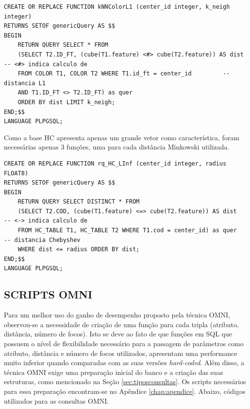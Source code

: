 \begin{lstlisting}[caption={Consulta k-vizinhos mais próximos sequencial utilizando cor e distância city-block}, captionpos=t,basicstyle=\tiny]
CREATE OR REPLACE FUNCTION kNNColorL1 (center_id integer, k_neigh integer) 
RETURNS SETOF genericQuery AS $$
BEGIN
	RETURN QUERY SELECT * FROM 
	(SELECT T2.ID_FT, (cube(T1.feature) <#> cube(T2.feature)) AS dist  -- <#> indica calculo de 
	FROM COLOR T1, COLOR T2 WHERE T1.id_ft = center_id 		   -- distancia L1
	AND T1.ID_FT <> T2.ID_FT) as quer 
	ORDER BY dist LIMIT k_neigh;	
END;$$
LANGUAGE PLPGSQL;
\end{lstlisting}

Como a base HC apresenta apenas um grande vetor como característica, foram necessárias apenas 3 funções, uma para cada distância Minkowski utilizada.

\begin{lstlisting}[caption={Consulta por abrangência sequencial utilizando distância Chebyshev para a base HC}, captionpos=t, basicstyle=\tiny]
CREATE OR REPLACE FUNCTION rq_HC_LInf (center_id integer, radius FLOAT8) 
RETURNS SETOF genericQuery AS $$
BEGIN
	RETURN QUERY SELECT DISTINCT * FROM 
	(SELECT T2.COD, (cube(T1.feature) <=> cube(T2.feature)) AS dist   -- <-> indica calculo de
	FROM HC_TABLE T1, HC_TABLE T2 WHERE T1.cod = center_id) as quer   -- distancia Chebyshev
	WHERE dist <= radius ORDER BY dist;		
END;$$
LANGUAGE PLPGSQL;
\end{lstlisting}

\subsection{SCRIPTS OMNI}
Para um melhor uso do ganho de desempenho proposto pela técnica OMNI, observou-se a necessidade de criação de uma função para cada tripla (atributo, distância, número de focos). Isto se deve ao fato de que funções em SQL que possuem
o nível de flexibilidade necessário para a passagem de parâmetros como atributo, distância e número de focos utilizados, apresentam uma performance muito inferior quando comparadas com as suas versões \textit{hard-coded}. Além disso, a técnica OMNI
exige uma preparação inicial do banco e a criação das suas estruturas, como mencionado na Seção \ref{sec:tiposconsultas}. Os scripts necessários para essa preparação encontram-se no Apêndice \ref{chap:apendice}. Abaixo, códigos utilizados para 
as consultas OMNI.

